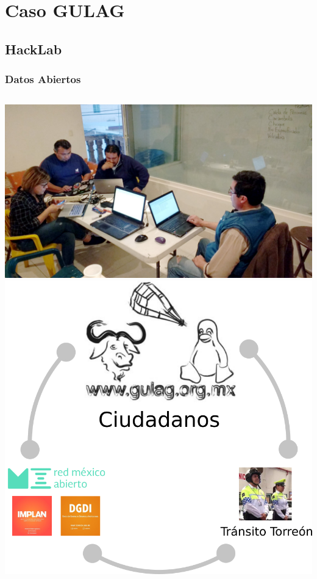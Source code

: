 %
%

\section{Caso GULAG}

\subsection{HackLab}
\begin{frame}
    \frametitle{Datos Abiertos}
    \begin{columns}
            \includegraphics[width=\textwidth]{hackaton-2016-02.jpg}
            \includegraphics[width=\textwidth]{Colaboradores03.png}
    \end{columns}
\end{frame}

